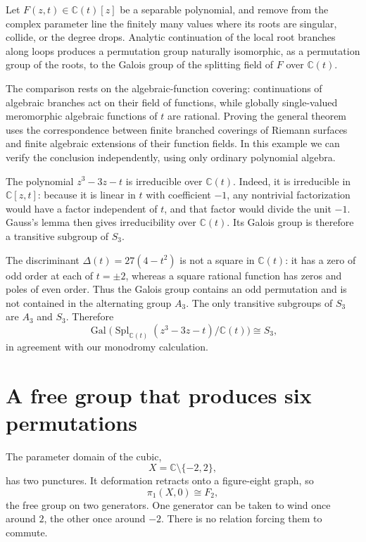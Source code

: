 \begin{theorem}
Let \(F(z,t)\in\mathbb C(t)[z]\) be a separable polynomial, and remove from the complex parameter line the finitely many values where its roots are singular, collide, or the degree drops. Analytic continuation of the local root branches along loops produces a permutation group naturally isomorphic, as a permutation group of the roots, to the Galois group of the splitting field of \(F\) over \(\mathbb C(t)\).
\end{theorem}

The comparison rests on the algebraic-function covering: continuations of algebraic branches act on their field of functions, while globally single-valued meromorphic algebraic functions of \(t\) are rational. Proving the general theorem uses the correspondence between finite branched coverings of Riemann surfaces and finite algebraic extensions of their function fields. In this example we can verify the conclusion independently, using only ordinary polynomial algebra.

The polynomial \(z^3-3z-t\) is irreducible over \(\mathbb C(t)\). Indeed, it is irreducible in \(\mathbb C[z,t]\): because it is linear in \(t\) with coefficient \(-1\), any nontrivial factorization would have a factor independent of \(t\), and that factor would divide the unit \(-1\). Gauss's lemma then gives irreducibility over \(\mathbb C(t)\). Its Galois group is therefore a transitive subgroup of \(S_3\).

The discriminant \(\Delta(t)=27(4-t^2)\) is not a square in \(\mathbb C(t)\): it has a zero of odd order at each of \(t=\pm2\), whereas a square rational function has zeros and poles of even order. Thus the Galois group contains an odd permutation and is not contained in the alternating group \(A_3\). The only transitive subgroups of \(S_3\) are \(A_3\) and \(S_3\). Therefore
\begin{equation}
 \operatorname{Gal}
 \bigl(\operatorname{Spl}_{\mathbb C(t)}(z^3-3z-t)/
 \mathbb C(t)\bigr)\cong S_3,
 \label{eq:N20261030-GalS3}
\end{equation}
in agreement with our monodromy calculation.

\section{A free group that produces six permutations}

The parameter domain of the cubic,
\[
 X=\mathbb C\setminus\{-2,2\},
\]
has two punctures. It deformation retracts onto a figure-eight graph, so
\[
 \pi_1(X,0)\cong F_2,
\]
the free group on two generators. One generator can be taken to wind once around \(2\), the other once around \(-2\). There is no relation forcing them to commute.

